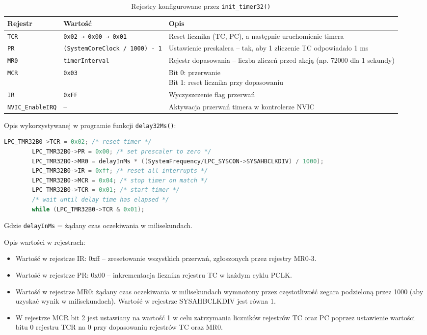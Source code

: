 \documentclass[a4paper,12pt]{report}
\begin{document}
\begin{table}[h!]
\centering
{\small
\begin{tabularx}{\textwidth}{|l|p{4cm}|X|}
\hline
\textbf{Rejestr} & \textbf{Wartość} & \textbf{Opis} \\
\hline
\texttt{TCR} & \texttt{0x02 → 0x00 → 0x01} & Reset licznika (TC, PC), a następnie uruchomienie timera \\
\hline
\texttt{PR} & \texttt{(SystemCoreClock / 1000) - 1} & Ustawienie preskalera – tak, aby 1 zliczenie TC odpowiadało 1 ms \\
\hline
\texttt{MR0} & \texttt{timerInterval} & Rejestr dopasowania – liczba zliczeń przed akcją (np. 72000 dla 1 sekundy) \\
\hline
\texttt{MCR} & \texttt{0x03} & \makecell[l]{Bit 0: przerwanie \\ Bit 1: reset licznika przy dopasowaniu} \\
\hline
\texttt{IR} & \texttt{0xFF} & Wyczyszczenie flag przerwań \\
\hline
\texttt{NVIC\_EnableIRQ} & -- & Aktywacja przerwań timera w kontrolerze NVIC \\
\hline
\end{tabularx}
}
\caption{Rejestry konfigurowane przez \texttt{init\_timer32()}}
\end{table}

Opis wykorzystywanej w programie funkcji \texttt{delay32Ms()}:\\
    \begin{lstlisting}[language=C]
        LPC_TMR32B0->TCR = 0x02; /* reset timer */
        LPC_TMR32B0->PR = 0x00; /* set prescaler to zero */
        LPC_TMR32B0->MR0 = delayInMs * ((SystemFrequency/LPC_SYSCON->SYSAHBCLKDIV) / 1000);
        LPC_TMR32B0->IR = 0xff; /* reset all interrupts */
        LPC_TMR32B0->MCR = 0x04; /* stop timer on match */
        LPC_TMR32B0->TCR = 0x01; /* start timer */
        /* wait until delay time has elapsed */
        while (LPC_TMR32B0->TCR & 0x01);
    \end{lstlisting}
\vspace{0.5em}

Gdzie \texttt{delayInMs} = żądany czas oczekiwania w milisekundach.

Opis wartości w rejestrach:
\begin{itemize}
    \item Wartość w rejestrze IR: 0xff – zresetowanie wszystkich przerwań, zgłoszonych przez rejestry MR0-3.
    \item Wartość w rejestrze PR: 0x00 – inkrementacja licznika rejestru TC w każdym cyklu PCLK.
    \item Wartość w rejestrze MR0: żądany czas oczekiwania w milisekundach wymnożony przez częstotliwość zegara podzieloną przez 1000 (aby uzyskać wynik w milisekundach). Wartość w rejestrze SYSAHBCLKDIV jest równa 1.
    \item W rejestrze MCR bit 2 jest ustawiany na wartość 1 w celu zatrzymania liczników rejestrów TC oraz PC poprzez ustawienie wartości bitu 0 rejestru TCR na 0 przy dopasowaniu rejestrów TC oraz MR0.
\end{itemize}
\end{document}

